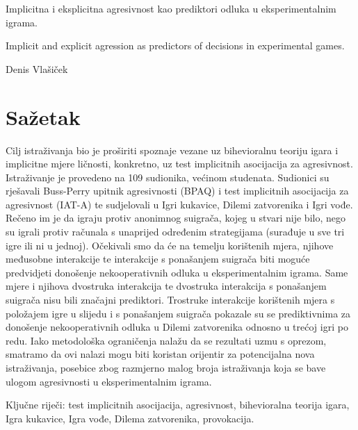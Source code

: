 \documentclass[a4paper, 12pt]{report}
\newcommand{\nocontentsline}[3]{}
\newcommand{\tocless}[2]{\bgroup\let\addcontentsline=\nocontentsline#1{#2}\egroup}
\begin{document}
\begin{singlespace}
    
\noindent Implicitna i eksplicitna agresivnost kao prediktori odluka u
    eksperimentalnim igrama.

    \noindent Implicit and explicit agression as predictors of decisions in
    experimental games.

    \noindent Denis Vlašiček

    \vspace{-0.5cm}
    \tocless\section{Sažetak}

Cilj istraživanja bio je proširiti spoznaje vezane uz bihevioralnu teoriju igara i
implicitne mjere ličnosti, konkretno, uz
test implicitnih asocijacija za agresivnost. Istraživanje je provedeno na 109
sudionika, većinom studenata. Sudionici su rješavali Buss-Perry upitnik
agresivnosti (BPAQ) i test implicitnih asocijacija za agresivnost (IAT-A) te
sudjelovali u Igri kukavice, Dilemi zatvorenika i Igri vođe. Rečeno im je da
igraju protiv anonimnog suigrača, kojeg u stvari nije bilo, nego su igrali
protiv računala s unaprijed određenim strategijama (surađuje u sve tri igre ili
ni u jednoj). Očekivali smo da će na temelju korištenih mjera, njihove međusobne
interakcije te interakcije s ponašanjem suigrača biti moguće predvidjeti
donošenje nekooperativnih odluka u eksperimentalnim igrama. Same mjere i njihova
dvostruka interakcija te dvostruka interakcija s ponašanjem suigrača nisu bili
značajni prediktori. Trostruke interakcije korištenih mjera s položajem igre u
slijedu i s ponašanjem suigrača pokazale su se prediktivnima za donošenje
nekooperativnih odluka u Dilemi zatvorenika odnosno u trećoj igri po redu.
Iako metodološka ograničenja nalažu da se rezultati uzmu s oprezom, smatramo da 
ovi nalazi mogu biti koristan orijentir za potencijalna nova istraživanja,
posebice zbog razmjerno malog broja istraživanja koja se bave ulogom
agresivnosti u eksperimentalnim igrama.
\bigskip

\noindent Ključne riječi: test implicitnih asocijacija, agresivnost, 
bihevioralna teorija igara, Igra kukavice, Igra vođe, Dilema zatvorenika, provokacija.

\tocless\section{Summary}


\end{singlespace}
\end{document}
